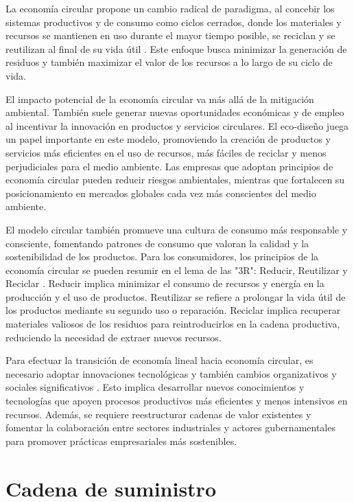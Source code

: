 \documentclass[main.tex]{subfiles}
\begin{document}
La economía circular propone un cambio radical de paradigma, al concebir los sistemas productivos y de consumo como ciclos cerrados, donde los materiales y recursos se mantienen en uso durante el mayor tiempo posible, se reciclan y se reutilizan al final de su vida útil \cite{circular2017economia}. Este enfoque busca minimizar la generación de residuos y también maximizar el valor de los recursos a lo largo de su ciclo de vida.

El impacto potencial de la economía circular va más allá de la mitigación ambiental. También suele generar nuevas oportunidades económicas y de empleo al incentivar la innovación en productos y servicios circulares. El eco-diseño juega un papel importante en este modelo, promoviendo la creación de productos y servicios más eficientes en el uso de recursos, más fáciles de reciclar y menos perjudiciales para el medio ambiente. Las empresas que adoptan principios de economía circular pueden reducir riesgos ambientales, mientras que fortalecen su posicionamiento en mercados globales cada vez más conscientes del medio ambiente.

El modelo circular también promueve una cultura de consumo más responsable y consciente, fomentando patrones de consumo que valoran la calidad y la sostenibilidad de los productos. Para los consumidores, los principios de la economía circular se pueden resumir en el lema de las "3R": Reducir, Reutilizar y Reciclar \cite{cerda2016economia}. Reducir implica minimizar el consumo de recursos y energía en la producción y el uso de productos. Reutilizar se refiere a prolongar la vida útil de los productos mediante su segundo uso o reparación. Reciclar implica recuperar materiales valiosos de los residuos para reintroducirlos en la cadena productiva, reduciendo la necesidad de extraer nuevos recursos.

Para efectuar la transición de economía lineal hacia economía circular, es necesario adoptar innovaciones tecnológicas y también cambios organizativos y sociales significativos \cite{espanacircular2030}. Esto implica desarrollar nuevos conocimientos y tecnologías que apoyen procesos productivos más eficientes y menos intensivos en recursos. Además, se requiere reestructurar cadenas de valor existentes y fomentar la colaboración entre sectores industriales y actores gubernamentales para promover prácticas empresariales más sostenibles.







\section{Cadena de suministro}
\end{document}
